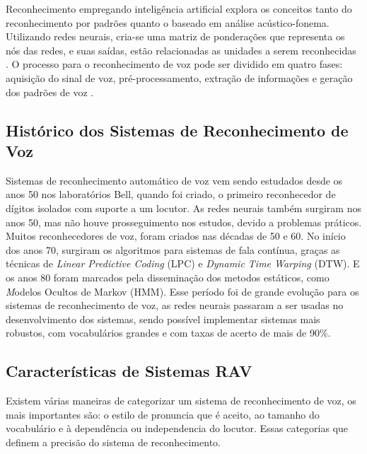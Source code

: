 Reconhecimento empregando inteligência artificial explora os conceitos tanto do reconhecimento por padrões quanto o baseado em análise acústico-fonema. Utilizando redes neurais, cria-se uma matriz de ponderações que representa os nós das redes, e suas saídas, estão relacionadas as unidades a serem reconhecidas \cite{AvaliaTecJose}.
O processo para o reconhecimento de voz pode ser dividido em quatro fases: aquisição do sinal de voz, pré-processamento, extração de informações e geração dos padrões de voz \cite{RavIsolAnderson}.






\subsection{Histórico dos Sistemas de Reconhecimento de Voz}\label{sec:red_khn}

Sistemas de reconhecimento automático de voz vem sendo estudados desde os anos 50 nos laboratórios Bell, quando foi criado, o primeiro reconhecedor de dígitos isolados com suporte a um locutor.\cite{Historico1} As redes neurais também surgiram nos anos 50, mas não houve prosseguimento nos estudos, devido a problemas práticos. Muitos reconhecedores de voz, foram criados nas décadas de 50 e 60.\cite{RavSpeechSadaoki} No início dos anos 70, surgiram os algoritmos para sistemas de fala contínua, graças as técnicas de \textit{Linear Predictive Coding} (LPC) e \textit{Dynamic Time Warping} (DTW). \cite{FundamentRabiner} E os anos 80 foram marcados pela disseminação dos metodos estáticos, como \textit Modelos Ocultos de Markov (HMM). \cite{FundamentRabiner} Esse período foi de grande evolução para os sistemas de reconhecimento de voz, as redes neurais passaram a ser usadas no desenvolvimento dos sistemas, sendo possível implementar sistemas mais robustos, com vocabulários grandes e com taxas de acerto de mais de 90{\%}.\cite{AvaliaTecJose} 

\subsection{Características de Sistemas RAV}\label{sec:red_neu}

Existem várias maneiras de categorizar um sistema de reconhecimento de voz, os mais importantes são: o estilo de pronuncia que é aceito, ao tamanho do vocabulário e à dependência ou independencia do locutor. \cite{Carac1} Essas categorias que definem a precisão do sistema de reconhecimento.

